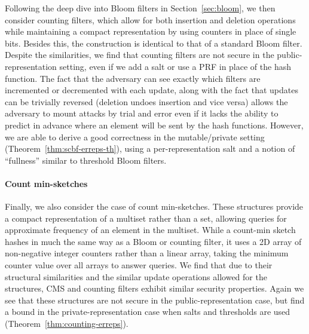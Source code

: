 Following the deep dive into Bloom filters in Section~\ref{sec:bloom}, we then
consider counting filters, which allow for both insertion and deletion operations
while maintaining a compact representation by using counters in place of single
bits. Besides this, the construction is identical to that of a standard Bloom filter.
Despite the similarities, we find that counting filters are not secure in the
public-representation setting, even if we add a salt or use a PRF in place of the
hash function. The fact that the adversary can see exactly which filters are
incremented or decremented with each update, along with the fact that updates can be
trivially reversed (deletion undoes insertion and vice versa) allows the
adversary to mount attacks by trial and error even if it lacks the ability to
predict in advance where an element will be sent by the hash functions.
However, we are able to derive a good correctness in the mutable/private setting
(Theorem~\ref{thm:scbf-erreps-th}), using a per-representation salt and a
notion of ``fullness'' similar to threshold Bloom filters.

\paragraph{Count min-sketches}
Finally, we also consider the case of count min-sketches. These structures
provide a compact representation of a
multiset rather than a set, allowing queries for
approximate frequency of an element in the multiset. While a count-min sketch
hashes in much the same way as a Bloom or counting filter, it uses a 2D array of non-negative
integer counters rather than a linear array, taking the minimum counter value
over all arrays to answer queries.
%
We find that due to their structural similarities and the similar update operations
allowed for the structures, CMS and counting filters exhibit similar security
properties. Again we see that these structures are not secure in the public-representation
case, but find a bound in the private-representation case when salts and thresholds
are used (Theorem~\ref{thm:counting-erreps}).
%


